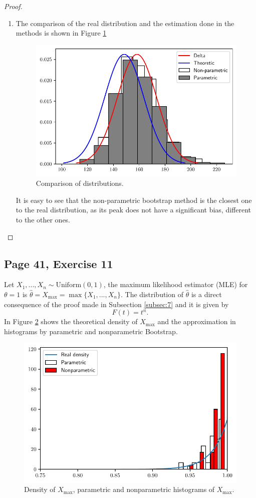 \documentclass[11pt]{article}
\theoremstyle{definition}
\theoremstyle{remark}
\theoremstyle{remark}
\begin{document}
\begin{proof}
\begin{enumerate}[label=\alph*)]
  \item The comparison of the real distribution and the estimation
    done in the methods is shown in Figure \ref{fig:ex11}
    \begin{figure}[H]
      \centering
      \includegraphics[scale=0.5]{../figs/delta-np.pdf}
      \caption{Comparison of distributions.}
      \label{fig:ex11}
    \end{figure}
    It is easy to see that the non-parametric bootstrap method is the
    closest one to the real distribution, as its peak does not have a
    significant bias, different to the other ones.
  \end{enumerate}
\end{proof}
\subsection*{Page 41, Exercise 11}
Let
$X_1,...,X_n\sim \mathrm{Uniform}(0,1)$, the maximum likelihood
estimator (MLE) for $\theta=1$ is
$\hat{\theta}=X_{\max}=\max\{X_1,...,X_n\}$. The distribution of
$\hat{\theta}$ is a direct consequence of the proof made in Subsection
\ref{subsec:7} and it is given by
\[
  F(t)=t^n.
\]
In Figure \ref{fig:max_density} shows the theoretical density of
$X_{\max}$ and the approximation in histograms by parametric and
nonparametric Bootstrap.
\begin{figure}[H]
  \centering
  \includegraphics[scale=.7]{../figs/max_density.pdf}
  \caption{Density of $X_{\max}$, parametric and nonparametric
    histograms of $X_{\max}$.}
  \label{fig:max_density}
\end{figure}
\end{document}
